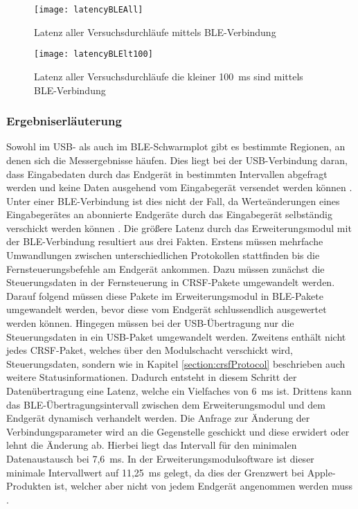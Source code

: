 \begin{figure}[H]
    \centering
    \texttt{[image: latencyBLEAll]}
    \caption{Latenz aller Versuchsdurchläufe mittels \ac{BLE}-Verbindung}
    \label{fig:latencyBLEAll}
\end{figure}

\begin{figure}[H]
    \centering
    \texttt{[image: latencyBLElt100]}
    \caption{Latenz aller Versuchsdurchläufe die kleiner 100~ms sind mittels \ac{BLE}-Verbindung}
    \label{fig:latencyBLElt100}
\end{figure}

\subsubsection{Ergebniserläuterung}
\label{section:resultExplanation}
Sowohl im \acs{USB}- als auch im \ac{BLE}-Schwarmplot gibt es bestimmte Regionen, an denen sich die Messergebnisse häufen. Dies liegt bei der \acs{USB}-Verbindung daran, dass Eingabedaten durch das Endgerät in bestimmten Intervallen abgefragt werden und keine Daten ausgehend vom Eingabegerät versendet werden können \cites[S.~48f., S.~277ff.]{usb2Spec}[S.~5]{wimmerLatenzStation}. Unter einer \ac{BLE}-Verbindung ist dies nicht der Fall, da Werteänderungen eines Eingabegerätes an abonnierte Endgeräte durch das Eingabegerät selbständig verschickt werden können \cite[S.~1516]{bluetoothCore}. Die größere Latenz durch das Erweiterungsmodul mit der \ac{BLE}-Verbindung resultiert aus drei Fakten. Erstens müssen mehrfache Umwandlungen zwischen unterschiedlichen Protokollen stattfinden bis die Fernsteuerungsbefehle am Endgerät ankommen. Dazu müssen zunächst die Steuerungsdaten in der Fernsteuerung in CRSF-Pakete umgewandelt werden. Darauf folgend müssen diese Pakete im Erweiterungsmodul in BLE-Pakete umgewandelt werden, bevor diese vom Endgerät schlussendlich ausgewertet werden können. Hingegen müssen bei der \acs{USB}-Übertragung nur die Steuerungsdaten in ein \acs{USB}-Paket umgewandelt werden. Zweitens enthält nicht jedes CRSF-Paket, welches über den Modulschacht verschickt wird, Steuerungsdaten, sondern wie in Kapitel \ref{section:crsfProtocol} beschrieben auch weitere Statusinformationen. Dadurch entsteht in diesem Schritt der Datenübertragung eine Latenz, welche ein Vielfaches von 6~ms ist. Drittens kann das \ac{BLE}-Übertragungsintervall zwischen dem Erweiterungsmodul und dem Endgerät dynamisch verhandelt werden. Die Anfrage zur Änderung der Verbindungsparameter wird an die Gegenstelle geschickt und diese erwidert oder lehnt die Änderung ab. Hierbei liegt das Intervall für den minimalen Datenaustausch bei 7,6~ms. In der Erweiterungsmodulsoftware ist dieser minimale Intervallwert auf 11,25~ms gelegt, da dies der Grenzwert bei Apple-Produkten ist, welcher aber nicht von jedem Endgerät angenommen werden muss \cite[S.~188]{appleDesignGuide}. \cite{bleConnectionParameter}

